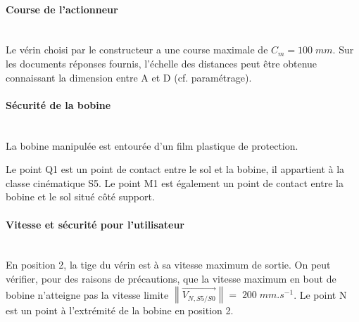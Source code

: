 \paragraph{Course de l'actionneur} ~\ \\
Le vérin choisi par le constructeur a une course maximale de $C_m=100\;mm$.
Sur les documents réponses fournis, l'échelle des distances peut être obtenue connaissant la dimension entre A et D (cf. paramétrage).


\paragraph{Sécurité de la bobine} ~\ \\
La bobine manipulée est entourée d'un film plastique de protection.

Le point Q1 est un point de contact entre le sol et la bobine, il appartient à la classe cinématique S5. Le point M1 est également un point de contact entre la bobine et le sol situé côté support.



\paragraph{Vitesse et sécurité pour l'utilisateur} ~\ \\

En position 2, la tige du vérin est à sa vitesse maximum de sortie. On peut vérifier, pour des raisons de précautions, que la vitesse maximum en bout de bobine n'atteigne pas la vitesse limite $\left\|\overrightarrow{V_{N,S5/S0}} \right\|=\;200\;mm.s^{-1}$. Le point N est un point à l'extrémité de la bobine en position 2.

